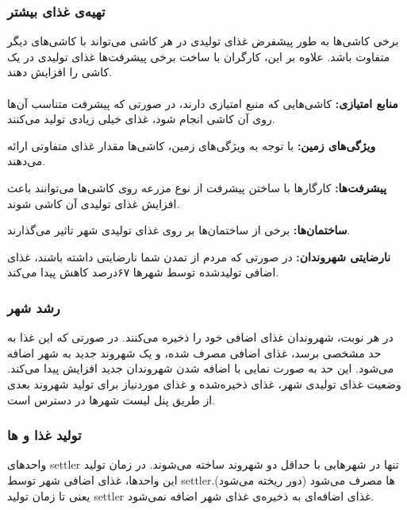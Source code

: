 \documentclass[]{article}
\begin{document}
\subsubsection*{{\titr تهیه‌ی غذای بیشتر}}
برخی کاشی‌ها به طور پیشفرض غذای تولیدی در هر کاشی می‌تواند با کاشی‌های دیگر متفاوت باشد. علاوه بر این، کارگران با ساخت برخی پیشرفت‌ها غذای تولیدی در یک کاشی را افزایش دهند.\\
\\
\noindent \textbf{منابع امتیازی:}
کاشی‌هایی که منبع امتیازی دارند، در صورتی که پیشرفت متناسب آن‌ها روی آن کاشی انجام شود، غذای خیلی زیادی تولید می‌کنند.

\noindent \textbf{ویژگی‌های زمین:}
با توجه به ویژگی‌های زمین، کاشی‌ها مقدار غذای متفاوتی ارائه می‌دهند.

\noindent \textbf{پیشرفت‌ها:}
کارگارها با ساختن پیشرفت از نوع مزرعه روی کاشی‌ها می‌توانند باعث افزایش غذای تولیدی آن کاشی شوند.

\noindent \textbf{ساختمان‌ها:}
برخی از ساختمان‌ها بر روی غذای تولیدی شهر تاثیر می‌گذارند.

\noindent \textbf{نارضایتی شهروندان:}
در صورتی که مردم از تمدن شما نارضایتی داشته باشند، غذای اضافی تولید‌شده توسط شهرها ۶۷درصد کاهش پیدا می‌کند.

\subsubsection*{{\titr رشد شهر}}
در هر نوبت، شهروندان غذای اضافی خود را ذخیره می‌کنند. در صورتی که این غذا به حد مشخصی برسد، غذای اضافی مصرف شده، و یک شهروند جدید به شهر اضافه می‌شود. این حد به صورت نمایی با اضافه شدن شهروندان جدید افزایش پیدا می‌کند. وضعیت غذای تولیدی شهر، غذای ذخیره‌شده و غذای موردنیاز برای تولید شهروند بعدی از طریق پنل لیست شهرها در دسترس است.

\subsubsection*{{\titr تولید غذا و ها}}
واحدهای settler تنها در شهرهایی با حداقل دو شهروند ساخته می‌شوند. در زمان تولید این واحدها، غذای اضافی شهر توسط settlerها مصرف می‌شود (دور ریخته می‌شود). یعنی تا زمان تولید settler غذای اضافه‌ای به ذخیره‌ی غذای شهر اضافه نمی‌شود.
\end{document}
